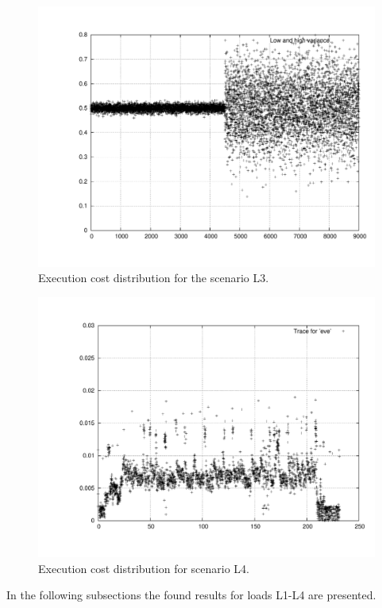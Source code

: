 \documentclass[times, 10pt,twocolumn]{article}
\begin{document}
\begin{figure}[h!t]
  \centering
  \includegraphics[scale=0.33]{trace-variance}
  \caption{Execution cost distribution for the scenario L3.}
  \label{fig:plotl3}
\end{figure}

\begin{figure}[h!t]
  \centering
  \includegraphics[scale=0.33]{trace-eve}
  \caption{Execution cost distribution for scenario L4.}
  \label{fig:plotl4}
\end{figure}

In the following subsections the found results for loads L1-L4 are presented. 
\end{document}
